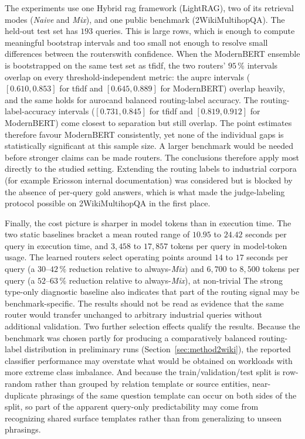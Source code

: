 \documentclass[english, bibtex]{kththesis}               %
\numberwithin{listing}{chapter}
\providecommand{\DIFaddtex}[1]{{\protect\color{blue} \sf #1}} %
\providecommand{\DIFdeltex}[1]{{\protect\color{red} \scriptsize #1}} %
\providecommand{\DIFaddbegin}{} %
\providecommand{\DIFaddend}{} %
\providecommand{\DIFdelbegin}{} %
\providecommand{\DIFdelend}{} %
\providecommand{\DIFadd}[1]{\texorpdfstring{\DIFaddtex{#1}}{#1}} %
\providecommand{\DIFdel}[1]{\texorpdfstring{\DIFdeltex{#1}}{}} %
\begin{document}
\DIFadd{The experiments use one Hybrid \gls{rag} framework (LightRAG), two of its retrieval modes (\emph{Naive} and \emph{Mix}), and one public benchmark (2WikiMultihopQA). The }\DIFaddend held-out test set has $193$ \DIFdelbegin \DIFdel{queries. This is large }\DIFdelend \DIFaddbegin \DIFadd{rows, which is }\DIFaddend enough to compute \DIFdelbegin \DIFdel{meaningful }\DIFdelend bootstrap intervals and \DIFdelbegin \DIFdel{too small }\DIFdelend \DIFaddbegin \DIFadd{not enough }\DIFaddend to resolve small differences between \DIFdelbegin \DIFdel{the routerswith confidence. When the ModernBERT ensemble is bootstrapped on the same test set as \gls{tfidf}, the two routers' $95\,\%$ intervals overlap on every threshold-independent metric: the \gls{auprc} intervals ($[0.610, 0.853]$ for \gls{tfidf} and $[0.645, 0.889]$ for ModernBERT) overlap heavily, and the same holds for \gls{auroc}and balanced routing-label accuracy. The routing-label-accuracy intervals ($[0.731, 0.845]$ for \gls{tfidf} and $[0.819, 0.912]$ for ModernBERT) come closest to separation but still overlap. The point estimates therefore favour ModernBERT consistently, yet none of the individual gaps is statistically significant at this sample size.
A larger benchmark would be needed before stronger claims can be made}\DIFdelend \DIFaddbegin \DIFadd{routers}\DIFaddend . \DIFaddbegin \DIFadd{The conclusions therefore apply most directly to the studied setting. Extending the routing labels to industrial corpora (for example Ericsson internal documentation) was considered but is blocked by the absence of per-query gold answers, which is what made the judge-labeling protocol possible on 2WikiMultihopQA in the first place.
}\DIFaddend 

\DIFdelbegin \DIFdel{Finally, the cost picture is sharper in model tokens than in execution time. The two static baselines bracket a mean routed range of $10.95$ to $24.42$ seconds per query in execution time, and $3{,}458$ to $17{,}857$ tokens per query in model-token usage. The learned routers select operating points around $14$ to $17$ seconds per query (a $30$--$42\,\%$ reduction relative to always-\emph{Mix}) and $6{,}700$ to $8{,}500$ tokens per query (a $52$--$63\,\%$ reduction relative to always-\emph{Mix}), at non-trivial }\DIFdelend \DIFaddbegin \DIFadd{The strong type-only diagnostic baseline also indicates that part of the routing signal may be benchmark-specific. The results should not be read as evidence that the same router would transfer unchanged to arbitrary industrial queries without additional validation. Two further selection effects qualify the results. Because the benchmark was chosen partly for producing a comparatively balanced routing-label distribution in preliminary runs (Section~\ref{sec:method2wiki}), the reported classifier performance may overstate what would be obtained on workloads with more extreme class imbalance. And because the train/validation/test split is row-random rather than grouped by relation template or source entities, near-duplicate phrasings of the same question template can occur on both sides of the split, so part of the apparent query-only predictability may come from recognizing shared surface templates rather than from generalizing to unseen phrasings.
}
\end{document}
